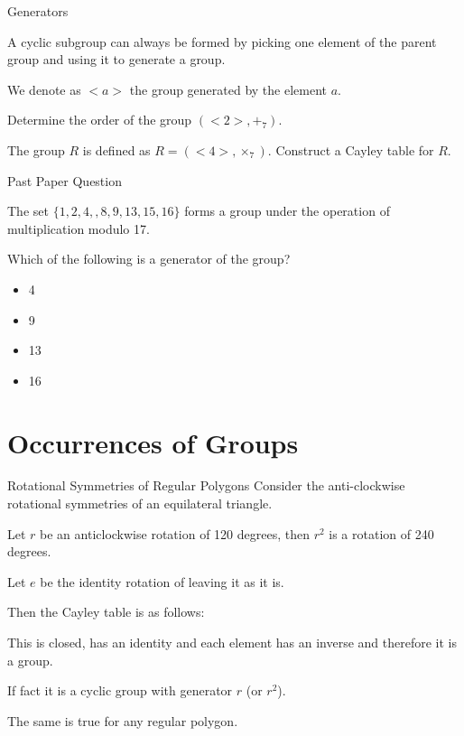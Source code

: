 \documentclass[8pt]{beamer}
\begin{document}
\begin{frame}{Generators}
	\begin{definition}
		A cyclic subgroup can always be formed by picking one element of the parent group and using it to generate a group.

		We denote as $<a>$ the group generated by the element  $a$.
	\end{definition}

	\begin{Problem}
		Determine the order of the group $(<2>,+_7)$.
	\end{Problem}


		\begin{Problem}
			The group $R$ is defined as  $R=(<4>,\times _7)$. Construct a Cayley table for  $R$.
			
		\end{Problem}
	
\end{frame}

\begin{frame}{Past Paper Question}
	\begin{Problem}
	The set $\{1,2,4,,8,9,13,15,16\}$ forms a group under the operation of multiplication modulo 17.

	Which of the following is a generator of the group?

	 \begin{itemize}
		\item 4
		\item 9
		\item 13
		\item 16
	\end{itemize}
\end{Problem}

\end{frame}

\section{Occurrences of Groups}

\begin{frame}{Rotational Symmetries of Regular Polygons}
	Consider the anti-clockwise rotational symmetries of an equilateral triangle.

	Let $r$ be an anticlockwise rotation of 120 degrees, then $r^2$ is a rotation of 240 degrees.

	Let $e$ be the identity rotation of leaving it as it is.

	Then the Cayley table is as follows:

	This is closed, has an identity and each element has an inverse and therefore it is a group. 

	If fact it is a cyclic group with generator  $r$ (or  $r^2$).

	The same is true for any regular polygon.
\end{frame}
\end{document}
